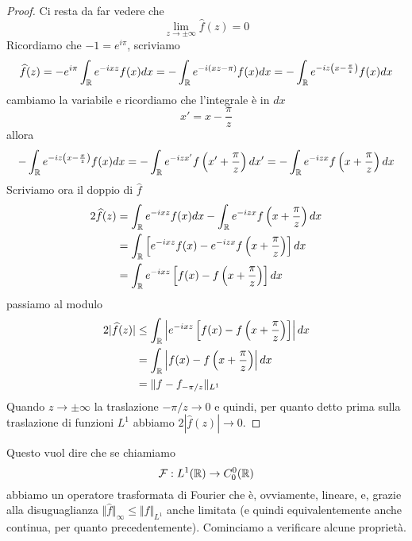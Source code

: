 \begin{proof}
Ci resta da far vedere che
\begin{equation*}
\lim\limits_{z\rightarrow \pm \infty}\hat{f}(z) = 0
\end{equation*}
Ricordiamo che $ - 1 = e^{i\pi}$, scriviamo
\begin{equation*}
\widehat{f}(z) = - e^{i\pi}\int_{\mathbb{R}} e^{- ixz} f(x) dx = - \int_{\mathbb{R}} e^{- i(xz - \pi)} f(x) dx = - \int_{\mathbb{R}} e^{- iz\left(x - \frac{\pi}{z}\right)} f(x) dx
\end{equation*}
cambiamo la variabile e ricordiamo che l'integrale è in $dx$
\begin{equation*}
x'= x - \frac{\pi}{z}
\end{equation*}
allora
\begin{equation*}
- \int_{\mathbb{R}} e^{- iz\left(x - \frac{\pi}{z}\right)} f(x) dx = - \int_{\mathbb{R}} e^{- izx'} f\left(x' + \frac{\pi}{z}\right) dx'= - \int_{\mathbb{R}} e^{- izx} f\left(x + \frac{\pi}{z}\right) dx
\end{equation*}
Scriviamo ora il doppio di $\hat{f}$
\begin{align*}
2\widehat{f}(z) & = \int_{\mathbb{R}} e^{- ixz} f(x) dx - \int_{\mathbb{R}} e^{- izx} f\left(x + \frac{\pi}{z}\right) dx\\
 & = \int_{\mathbb{R}}\left[e^{- ixz} f(x) - e^{- izx} f\left(x + \frac{\pi}{z}\right)\right] dx\\
 & = \int_{\mathbb{R}} e^{- ixz}\left[f(x) - f\left(x + \frac{\pi}{z}\right)\right] dx
\end{align*}
passiamo al modulo
\begin{align*}
2| \widehat{f}(z)| & \leq \int_{\mathbb{R}}\left| e^{- ixz}\left[f(x) - f\left(x + \frac{\pi}{z}\right)\right]\right| dx\\
 & = \int_{\mathbb{R}}\left| f(x) - f\left(x + \frac{\pi}{z}\right)\right| dx\\
 & = \Vert f - f_{- \pi /z} \Vert_{L^{1}}
\end{align*}
Quando $z\rightarrow \pm \infty $ la traslazione $ - \pi /z\rightarrow 0$ e quindi, per quanto detto prima sulla traslazione di funzioni $L^{1}$ abbiamo $2| \hat{f}(z)| \rightarrow 0$.

\end{proof}

Questo vuol dire che se chiamiamo
\begin{equation*}
\mathcal{F} : L^{1}(\mathbb{R})\rightarrow C^{0}_{0}(\mathbb{R})
\end{equation*}
abbiamo un operatore trasformata di Fourier che è, ovviamente, lineare, e, grazie alla disuguaglianza $ \Vert \hat{f} \Vert_{\infty} \leq \Vert f \Vert_{L^{1}}$ anche limitata (e quindi equivalentemente anche continua, per quanto precedentemente). Cominciamo a verificare alcune proprietà.


